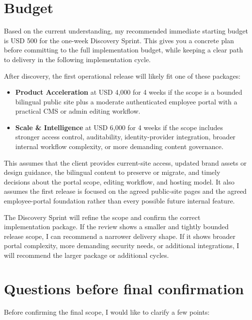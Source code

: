 \documentclass[11pt,a4paper]{article}
\begin{document}
\section*{Budget}

Based on the current understanding, my recommended immediate starting budget is USD 500 for the one-week Discovery Sprint. This gives you a concrete plan before committing to the full implementation budget, while keeping a clear path to delivery in the following implementation cycle.\par

After discovery, the first operational release will likely fit one of these packages:\par

\begin{itemize}
\item \textbf{Product Acceleration} at USD 4,000 for 4 weeks if the scope is a bounded bilingual public site plus a moderate authenticated employee portal with a practical CMS or admin editing workflow.
\item \textbf{Scale \& Intelligence} at USD 6,000 for 4 weeks if the scope includes stronger access control, auditability, identity-provider integration, broader internal workflow complexity, or more demanding content governance.
\end{itemize}

This assumes that the client provides current-site access, updated brand assets or design guidance, the bilingual content to preserve or migrate, and timely decisions about the portal scope, editing workflow, and hosting model. It also assumes the first release is focused on the agreed public-site pages and the agreed employee-portal foundation rather than every possible future internal feature.\par

The Discovery Sprint will refine the scope and confirm the correct implementation package. If the review shows a smaller and tightly bounded release scope, I can recommend a narrower delivery shape. If it shows broader portal complexity, more demanding security needs, or additional integrations, I will recommend the larger package or additional cycles.\par

\section*{Questions before final confirmation}

Before confirming the final scope, I would like to clarify a few points:\par
\end{document}
